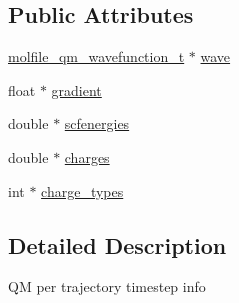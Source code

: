 \subsection*{\-Public \-Attributes}
\begin{DoxyCompactItemize}
\item 
\hyperlink{structmolfile__qm__wavefunction__t}{molfile\-\_\-qm\-\_\-wavefunction\-\_\-t} $\ast$ \hyperlink{structmolfile__qm__timestep__t_a7ad01de8fe8ca9ec91774685f35effdc}{wave}
\item 
float $\ast$ \hyperlink{structmolfile__qm__timestep__t_a837a7b0303ef98e8f09537297b1fc19a}{gradient}
\item 
double $\ast$ \hyperlink{structmolfile__qm__timestep__t_ad0d8c7fca3efe89733c9f31ad867d3f3}{scfenergies}
\item 
double $\ast$ \hyperlink{structmolfile__qm__timestep__t_a79650cf04b5ae7657547d18a1e01e179}{charges}
\item 
int $\ast$ \hyperlink{structmolfile__qm__timestep__t_aac492bc636fb040648cb013b5fa2fb3f}{charge\-\_\-types}
\end{DoxyCompactItemize}


\subsection{\-Detailed \-Description}
\-Q\-M per trajectory timestep info 

